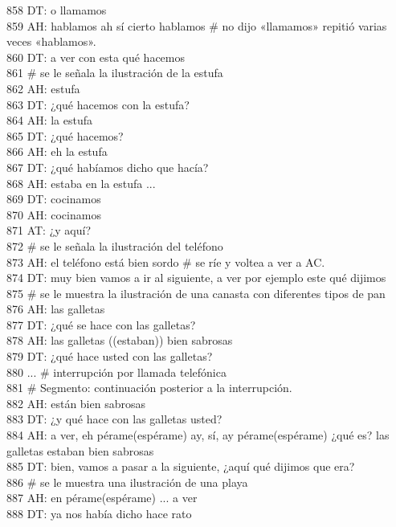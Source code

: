 858 DT: o llamamos\\
859 AH: hablamos ah sí cierto hablamos # no dijo «llamamos» repitió varias veces «hablamos».\\
860 DT: a ver con esta qué hacemos\\
861 # se le señala la ilustración de la estufa\\
862 AH: estufa\\
863 DT: ¿qué hacemos con la estufa?\\
864 AH: la estufa\\
865 DT: ¿qué hacemos?\\
866 AH: eh la estufa\\
867 DT: ¿qué habíamos dicho que hacía?\\
868 AH: estaba en la estufa ...\\
869 DT: cocinamos\\
870 AH: cocinamos\\
871 AT: ¿y aquí?\\
872 # se le señala la ilustración del teléfono\\
873 AH: el teléfono está bien sordo # se ríe y voltea a ver a AC.\\
874 DT: muy bien vamos a ir al siguiente, a ver por ejemplo este qué dijimos\\
875 # se le muestra la ilustración de una canasta con diferentes tipos de pan\\
876 AH: las galletas\\
877 DT: ¿qué se hace con las galletas?\\
878 AH: las galletas ((estaban)) bien sabrosas\\
879 DT: ¿qué hace usted con las galletas?\\
880 ... # interrupción por llamada telefónica\\
881 # Segmento: continuación posterior a la interrupción.\\
882 AH: están bien sabrosas\\
883 DT: ¿y qué hace con las galletas usted?\\
884 AH: a ver, eh pérame(espérame) ay, sí, ay pérame(espérame) ¿qué es? las galletas estaban bien sabrosas\\
885 DT: bien, vamos a pasar a la siguiente, ¿aquí qué dijimos que era?\\
886 # se le muestra una ilustración de una playa\\
887 AH: en pérame(espérame) ... a ver\\
888 DT: ya nos había dicho hace rato\\
